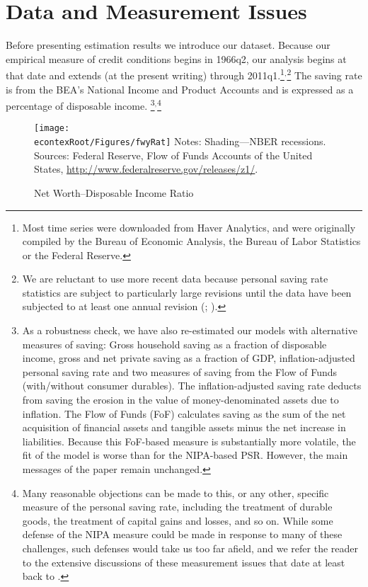 \documentclass[titlepage]{\econtex}
\begin{document}
\section{Data and Measurement Issues} \label{DataAndMeasurement}

Before presenting estimation results we introduce our dataset.  Because our empirical measure of credit conditions begins in 1966q2, our analysis begins at that date and extends (at the present writing) through 2011q1.\footnote{Most time series were downloaded from Haver
  Analytics, and were originally compiled by the Bureau of Economic
  Analysis, the Bureau of Labor Statistics or the Federal Reserve.}$^{,}$\footnote{We are reluctant to use more recent data because personal saving rate statistics are subject to particularly large revisions until the data have been subjected to at least one annual revision (\cite{consumerGEP}; \cite{nsSavingRevisions}).} The saving rate is from the BEA's National Income and Product Accounts and is expressed as a percentage of disposable income.%
\footnote{  As a robustness check, we have also re-estimated our models with
  alternative measures of saving: Gross household saving as a fraction of disposable income, gross and net private saving as a fraction of GDP, inflation-adjusted personal saving rate and two measures of saving from the Flow of Funds (with/without consumer durables). The inflation-adjusted saving rate deducts from saving the erosion in the value of money-denominated assets due to inflation. The Flow of Funds (FoF) calculates saving as the sum of the net acquisition of financial assets and
  tangible assets minus the net increase in liabilities. Because this
  FoF-based measure is substantially more volatile, the fit of the
  model is worse than for the NIPA-based PSR. However, the main
  messages of the paper remain unchanged.  }$^{,}$\footnote{Many reasonable objections
can be made to this, or any other, specific measure of the personal saving rate, including
the treatment of durable goods, the treatment of capital gains and losses, and so on.  While
some defense of the NIPA measure could be made in response to many of these challenges, such
defenses would take us too far afield, and we refer the reader to the extensive discussions
of these measurement issues that date at least back to \cite{friedmanATheory}.}


\begin{figure}
\caption{Net Worth--Disposable Income Ratio}
\label{fwyRat}
\texttt{[image: \\econtexRoot/Figures/fwyRat]}
\footnotesize
Notes: Shading---NBER recessions.\\[0mm]
\tiny Sources: Federal Reserve, Flow of Funds Accounts of the United States, \url{http://www.federalreserve.gov/releases/z1/}.
\end{figure}
\end{document}
